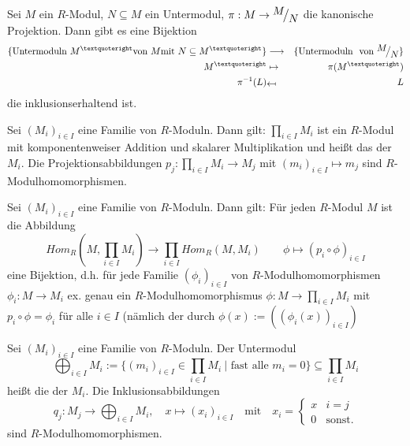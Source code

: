 \begin{sa}\label{sa1.14}
	Sei $M$ ein $R$-Modul, $N \subseteq M$ ein Untermodul, $ \pi: M \to \QR{M}{N} $ die kanonische Projektion. Dann gibt es eine Bijektion 
	\begin{eqnarray*}
		\{\text{Untermoduln} \ M^{’} \text{von} \  M \text{mit} \ N \subseteq M^{’} \} &\longrightarrow &\{\text{Untermoduln } \text{ von } \QR{M}{N}\}\\
		M^{’}& \mapsto & \pi(M^{’}) \\
		\pi^{-1}(L) &\rotatebox[]{180}{$\mapsto$} & L %
	\end{eqnarray*}
	die inklusionserhaltend ist.
\end{sa}
\begin{bem+df}\label{bemdf1.15}
	Sei $(M_i)_{i \in I}$ eine Familie von $R$-Moduln. Dann gilt: $\prod_{i \in I} M_i$ ist ein $R$-Modul mit komponentenweiser Addition und skalarer Multiplikation und heißt das  der $M_{i}$. Die Projektionsabbildungen $p_{j}: \prod_{i \in I} M_i \to M_{j} $ mit $(m_i)_{i \in I} \mapsto m_j $ sind $R$-Modulhomomorphismen.
\end{bem+df}
\begin{sa}\label{sa1.16} Sei $(M_i)_{i \in I}$ eine Familie von $R$-Moduln. Dann gilt: Für jeden $R$-Modul $M$ ist die Abbildung $$ Hom_{R}(M,\prod_{i \in I} M_i) \to \prod_{i \in I} Hom_{R}(M,M_i) \qquad \phi \mapsto (p_i \circ \phi)_{i \in I}$$
	eine Bijektion, d.h. für jede Familie $(\phi_i)_{i \in I}$ von $R$-Modulhomomorphismen $\phi_i: M \to M_i $ ex. genau ein $R$-Modulhomomorphismus $\phi: M \to \prod_{i \in I} M_i$ mit $ p_i \circ \phi = \phi_i$ für alle $i \in I$ (nämlich der durch $\phi(x) := ((\phi_i(x))_{i\in I}) $
\end{sa}
\begin{df}\label{df1.17}
	Sei $(M_i)_{i \in I}$ eine Familie von $R$-Moduln. Der Untermodul $$ \bigoplus_{i \in I} M_i := \{(m_i)_{i \in I} \in \prod_{i \in I} M_i \ | \text{ fast alle }  m_i =0\} \subseteq \prod_{i \in I} M_i $$ 
	heißt die  der $M_i$. Die Inklusionsabbildungen $$q_j: M_j \to \bigoplus_{i \in I} M_i, \quad x \mapsto (x_i)_{i \in I} \quad \text{mit} \quad x_i=\begin{cases} x & i = j \\ 0 & \text{sonst.} \end{cases}$$ sind $R$-Modulhomomorphismen.
\end{df}
